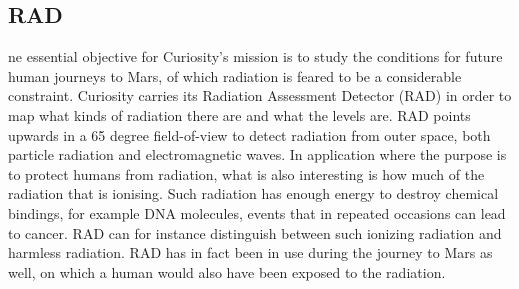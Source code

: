 \subsection*{RAD}
ne essential objective for Curiosity's mission is to study the conditions for future human journeys to Mars, of which radiation is feared to be a considerable constraint.
Curiosity carries its Radiation Assessment Detector (RAD) in order to map what kinds of radiation there are and what the levels are.
RAD points upwards in a 65 degree field-of-view to detect radiation from outer space, both particle radiation and electromagnetic waves.
In application where the purpose is to protect humans from radiation, what is also interesting is how much of the radiation that is ionising.
Such radiation has enough energy to destroy chemical bindings, for example DNA molecules, events that in repeated occasions can lead to cancer.
RAD can for instance distinguish between such ionizing radiation and harmless radiation.
RAD has in fact been in use during the journey to Mars as well, on which a human would also have been exposed to the radiation. \cite{RAD}